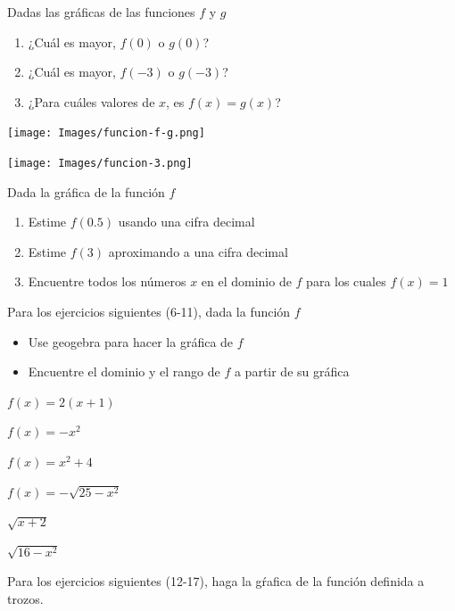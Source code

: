 \documentclass[10pt,twoside]{article}
\begin{document}
\begin{enumerate}
\begin{minipage}{.55\textwidth}
  \item Dadas las gráficas de las funciones $ f $ y $ g $
  \begin{enumerate}
    \item ¿Cuál es mayor, $ f(0) $ o $ g(0) $?
    \item ¿Cuál es mayor, $ f(-3) $ o $ g(-3) $?
    \item ¿Para cuáles valores de $ x $, es $ f(x)=g(x) $?
  \end{enumerate}
\end{minipage}\hfill
\begin{minipage}{.35\textwidth}
  \texttt{[image: Images/funcion-f-g.png]}
\end{minipage}
  \begin{minipage}{.4\textwidth}
    \texttt{[image: Images/funcion-3.png]}
  \end{minipage}\hfill
  \begin{minipage}{.5\textwidth}
    \item Dada la gráfica de la función $ f $
    \begin{enumerate}
      \item Estime $ f(0.5) $ usando una cifra decimal
      \item Estime $ f(3) $ aproximando a una cifra decimal
      \item Encuentre todos los números $ x $ en el dominio de $ f $ para los cuales $ f(x)=1 $
    \end{enumerate}
  \end{minipage}
  Para los ejercicios siguientes (6-11), dada la función $ f $
  \begin{itemize}
     \item Use geogebra para hacer la gráfica de $ f $
     \item Encuentre el dominio y el rango de $ f $ a partir de su gráfica
   \end{itemize}
   \begin{multicols}{2}
   \item $ f(x)=2(x+1) $  \item $ f(x)=-x^2 $
   \item $ f(x)=x^2+4 $ \item $ f(x)=-\sqrt{25-x^2} $
   \item $ \sqrt{x+2} $ \item $ \sqrt{16-x^2} $
   \end{multicols}
Para los ejercicios siguientes (12-17), haga la gŕafica de la función definida a trozos.
\begin{multicols}{2}

\end{multicols}
\end{enumerate}
\end{document}
